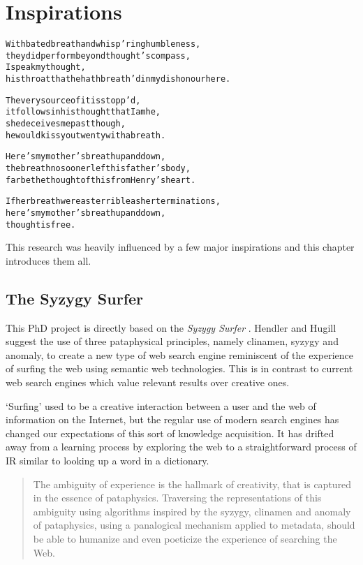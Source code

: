 
\chapter{Inspirations}
\label{ch:inspirations}

\startcontents[chapters]

\vfill

\begin{alltt}\sffamily
With bated breath and whisp'ring humbleness,
they did perform beyond thought's compass,
I speak my thought,
his throat that he hath breath'd in my dishonour here.

The very source of it is stopp'd,
it follows in his thought that I am he,
she deceives me past though,
he would kiss you twenty with a breath.  

Here's my mother's breath up and down,
the breath no sooner left his father's body,
far be the thought of this from Henry's heart.

If her breath were as terrible as her terminations,
here's my mother's breath up and down,
thought is free.
\end{alltt}

\newpage
\minicontents
\spirals

This research was heavily influenced by a few major inspirations and this chapter introduces them all.


\section{The Syzygy Surfer}
\label{s:surfer}

This PhD project is directly based on the \textit{Syzygy Surfer} \autocite{Hendler2011, Hendler2013}. Hendler and Hugill suggest the use of three pataphysical principles, namely clinamen, syzygy and anomaly, to create a new type of web search engine reminiscent of the experience of surfing the web using semantic web technologies. This is in contrast to current web search engines which value relevant results over creative ones.

`Surfing' used to be a creative interaction between a user and the web of information on the Internet, but the regular use of modern search engines has changed our expectations of this sort of knowledge acquisition. It has drifted away from a learning process by exploring the web to a straightforward process of \ac{IR} similar to looking up a word in a dictionary.

\begin{quotation}
  The ambiguity of experience is the hallmark of creativity, that is captured in the essence of pataphysics. Traversing the representations of this ambiguity using algorithms inspired by the syzygy, clinamen and anomaly of pataphysics, using a panalogical mechanism applied to metadata, should be able to humanize and even poeticize the experience of searching the Web. 
\end{quotation}

